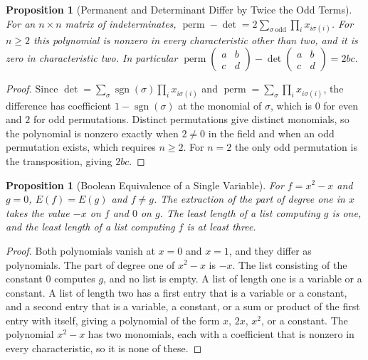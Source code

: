 \documentclass[11pt,letterpaper]{report}
\theoremstyle{plain}
\newtheorem{proposition}[theorem]{Proposition}
\theoremstyle{definition}
\theoremstyle{remark}
\begin{document}
\begin{proposition}[Permanent and Determinant Differ by Twice the Odd Terms]\label{pr:permdetdiff}
For an $n\times n$ matrix of indeterminates, $\operatorname{perm}-\det=2\sum_{\sigma\ \mathrm{odd}}\prod_{i}x_{i\sigma(i)}$. For $n\ge2$ this polynomial is nonzero in every characteristic other than two, and it is zero in characteristic two. In particular $\operatorname{perm}\begin{pmatrix}a&b\\c&d\end{pmatrix}-\det\begin{pmatrix}a&b\\c&d\end{pmatrix}=2bc$.
\end{proposition}
\begin{proof}
Since $\det=\sum_\sigma\operatorname{sgn}(\sigma)\prod_ix_{i\sigma(i)}$ and $\operatorname{perm}=\sum_\sigma\prod_ix_{i\sigma(i)}$, the difference has coefficient $1-\operatorname{sgn}(\sigma)$ at the monomial of $\sigma$, which is $0$ for even and $2$ for odd permutations. Distinct permutations give distinct monomials, so the polynomial is nonzero exactly when $2\ne0$ in the field and when an odd permutation exists, which requires $n\ge2$. For $n=2$ the only odd permutation is the transposition, giving $2bc$.
\end{proof}

\begin{proposition}[Boolean Equivalence of a Single Variable]\label{pr:boolsingle}
For $f=x^2-x$ and $g=0$, $E(f)=E(g)$ and $f\ne g$. The extraction of the part of degree one in $x$ takes the value $-x$ on $f$ and $0$ on $g$. The least length of a list computing $g$ is one, and the least length of a list computing $f$ is at least three.
\end{proposition}
\begin{proof}
Both polynomials vanish at $x=0$ and $x=1$, and they differ as polynomials. The part of degree one of $x^2-x$ is $-x$. The list consisting of the constant $0$ computes $g$, and no list is empty. A list of length one is a variable or a constant. A list of length two has a first entry that is a variable or a constant, and a second entry that is a variable, a constant, or a sum or product of the first entry with itself, giving a polynomial of the form $x$, $2x$, $x^2$, or a constant. The polynomial $x^2-x$ has two monomials, each with a coefficient that is nonzero in every characteristic, so it is none of these.
\end{proof}
\end{document}
